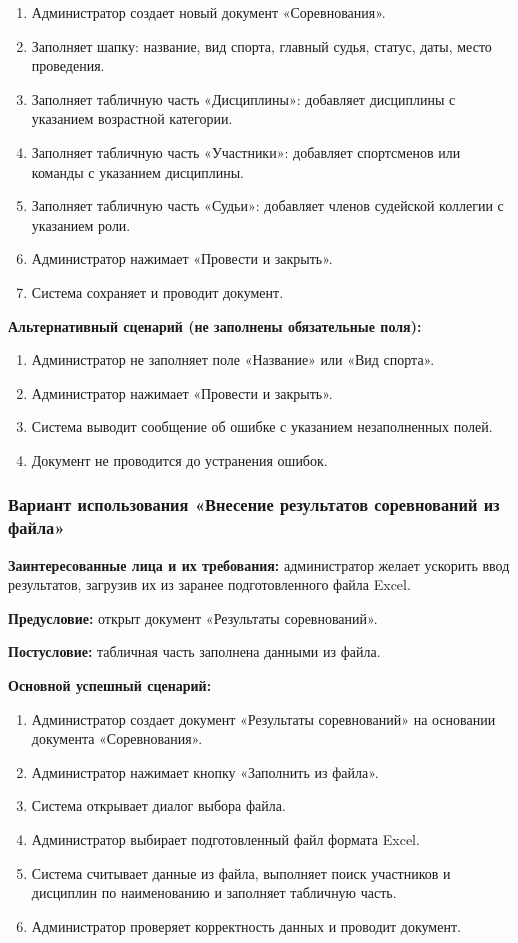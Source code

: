 \begin{enumerate}
	\item Администратор создает новый документ «Соревнования».
	\item Заполняет шапку: название, вид спорта, главный судья, статус, даты, место проведения.
	\item Заполняет табличную часть «Дисциплины»: добавляет дисциплины с указанием возрастной категории.
	\item Заполняет табличную часть «Участники»: добавляет спортсменов или команды с указанием дисциплины.
	\item Заполняет табличную часть «Судьи»: добавляет членов судейской коллегии с указанием роли.
	\item Администратор нажимает «Провести и закрыть».
	\item Система сохраняет и проводит документ.
\end{enumerate}

\textbf{Альтернативный сценарий (не заполнены обязательные поля):}

\begin{enumerate}
	\item Администратор не заполняет поле «Название» или «Вид спорта».
	\item Администратор нажимает «Провести и закрыть».
	\item Система выводит сообщение об ошибке с указанием незаполненных полей.
	\item Документ не проводится до устранения ошибок.
\end{enumerate}

\subsubsection{Вариант использования «Внесение результатов соревнований из файла»}

\textbf{Заинтересованные лица и их требования:} администратор желает ускорить ввод результатов, загрузив их из заранее подготовленного файла Excel.

\textbf{Предусловие:} открыт документ «Результаты соревнований».

\textbf{Постусловие:} табличная часть заполнена данными из файла.

\textbf{Основной успешный сценарий:}

\begin{enumerate}
	\item Администратор создает документ «Результаты соревнований» на основании документа «Соревнования».
	\item Администратор нажимает кнопку «Заполнить из файла».
	\item Система открывает диалог выбора файла.
	\item Администратор выбирает подготовленный файл формата Excel.
	\item Система считывает данные из файла, выполняет поиск участников и дисциплин по наименованию и заполняет табличную часть.
	\item Администратор проверяет корректность данных и проводит документ.
\end{enumerate}

